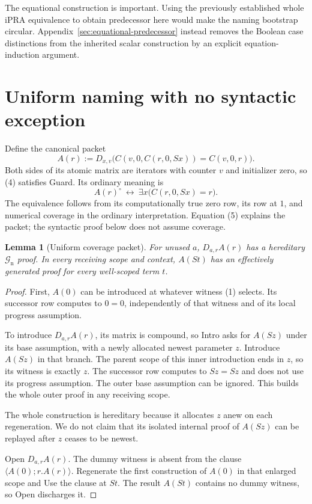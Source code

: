 \documentclass[11pt]{article}
\newtheorem{lemma}[theorem]{Lemma}
\theoremstyle{definition}\newtheorem{definition}[theorem]{Definition}
\theoremstyle{remark}\newtheorem{remark}[theorem]{Remark}
\newcommand{\Gn}{\mathcal G_{\mathrm n}}
\begin{document}
The equational construction is important. Using the previously established
whole iPRA equivalence to obtain predecessor here would make the naming
bootstrap circular. Appendix~\ref{sec:equational-predecessor} instead
removes the Boolean case distinctions from the inherited scalar
construction by an explicit equation-induction argument.

\section{Uniform naming with no syntactic exception}
\label{sec:naming}

Define the canonical packet
\[
 A(r):=D_{x,v}\bigl(
 C(v,0,C(r,0,Sx))=C(v,0,r)\bigr).                        \tag{4}
\]
Both sides of its atomic matrix are iterators with counter $v$ and
initializer zero, so (4) satisfies Guard. Its ordinary meaning is
\[
 A(r)^\circ\ \longleftrightarrow\
          \exists x\bigl(C(r,0,Sx)=r\bigr).              \tag{5}
\]
The equivalence follows from its computationally true zero row, its
row at $1$, and numerical coverage in the ordinary interpretation.
Equation (5) explains the packet; the syntactic proof below does not
assume coverage.

\begin{lemma}[Uniform coverage packet]
\label{lem:packet}
For unused $a$, $D_{a,r}A(r)$ has a hereditary $\Gn$ proof. In every
receiving scope and context, $A(St)$ has an effectively generated proof
for every well-scoped term $t$.
\end{lemma}
\begin{proof}
First, $A(0)$ can be introduced at whatever witness (1) selects.
Its successor row computes to $0=0$, independently of that witness
and of its local progress assumption.

To introduce $D_{a,r}A(r)$, its matrix is compound, so Intro asks for
$A(Sz)$ under its base assumption, with a newly allocated newest
parameter $z$. Introduce $A(Sz)$ in that branch. The parent scope of
this inner introduction ends in $z$, so its witness is exactly $z$.
The successor row computes to $Sz=Sz$ and does not use its progress
assumption. The outer base assumption can be ignored. This builds the
whole outer proof in any receiving scope.

The whole construction is hereditary because it allocates $z$ anew on
each regeneration. We do not claim that its isolated internal proof of
$A(Sz)$ can be replayed after $z$ ceases to be newest.

Open $D_{a,r}A(r)$. The dummy witness is absent from the clause
$\langle A(0);r.A(r)\rangle$. Regenerate the first construction of
$A(0)$ in that enlarged scope and Use the clause at $St$. The result
$A(St)$ contains no dummy witness, so Open discharges it.
\end{proof}
\end{document}
